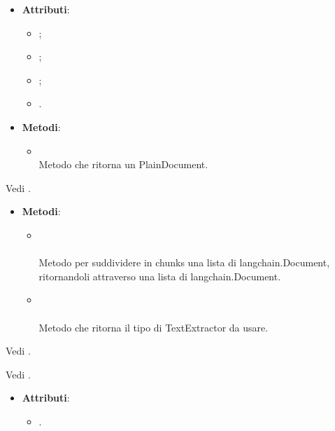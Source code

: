 \documentclass[10pt, a4paper]{article}
\begin{document}
\label{AWSDocumentDettaglio}
\begin{itemize}
    \item \textbf{Attributi}:
    \begin{itemize}
        \item {};
        \item {};
        \item {};
        \item {}.
    \end{itemize}
    \item \textbf{Metodi}:
    \begin{itemize}
        \item {}\\
        Metodo che ritorna un PlainDocument.
    \end{itemize}
\end{itemize}   

Vedi .

\label{ChunkerizerDettaglio}
\begin{itemize}
    \item \textbf{Metodi}:
    \begin{itemize}
        \item {}\\ \\
        Metodo per suddividere in chunks una lista di langchain.Document, ritornandoli attraverso una lista di langchain.Document.
        
        \item {}\\ \\
        Metodo che ritorna il tipo di TextExtractor da usare.
    \end{itemize}  
\end{itemize}

Vedi .

Vedi .

\label{DocumentStatusDettaglio}
\begin{itemize}
    \item \textbf{Attributi}:
    \begin{itemize}
        \item {}.
    \end{itemize}
\end{itemize}
\end{document}
